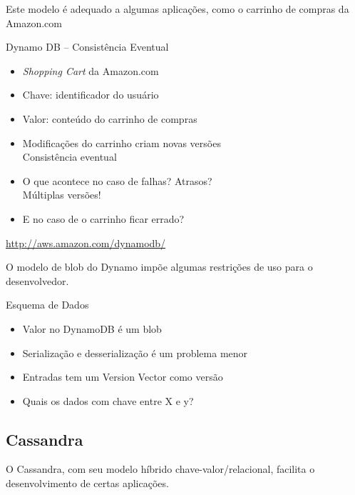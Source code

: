 Este modelo é adequado a algumas aplicações, como o carrinho de compras da Amazon.com
\begin{frame}{Dynamo DB -- Consistência Eventual}
\begin{itemize}
\item \emph{Shopping Cart} da Amazon.com
\item Chave: identificador do usuário
\item Valor: conteúdo do carrinho de compras
\item Modificações do carrinho criam novas versões\\  \alert{Consistência eventual}
\item O que acontece no caso de falhas? Atrasos? \\   \alert{Múltiplas versões!}
\item E no caso de o carrinho ficar errado?
\end{itemize}

\url{http://aws.amazon.com/dynamodb/}
\end{frame}

O modelo de blob do Dynamo impõe algumas restrições de uso para o desenvolvedor.

\begin{frame}{Esquema de Dados}
\begin{itemize}
\item Valor no DynamoDB é um \alert{blob}
\item Serialização e desserialização é um problema menor
\item Entradas tem um Version Vector como versão
\item Quais os dados com chave entre X e y?
\end{itemize}
\end{frame}


\subsection{Cassandra}
O Cassandra, com seu modelo híbrido chave-valor/relacional, facilita o desenvolvimento de certas aplicações.

